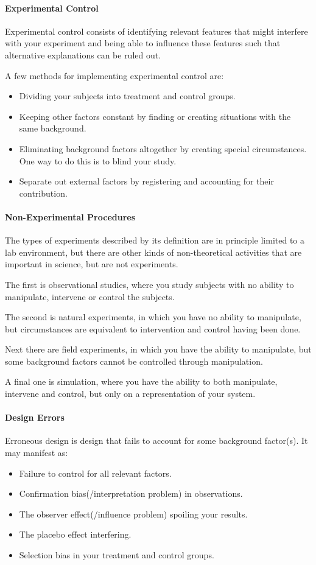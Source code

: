 \paragraph{Experimental Control}
Experimental control consists of identifying relevant features that might interfere with your experiment and being able to influence these features such that alternative explanations can be ruled out.

A few methods for implementing experimental control are:
\begin{itemize}
	\item Dividing your subjects into treatment and control groups.
	\item Keeping other factors constant by finding or creating situations with the same background.
	\item Eliminating background factors altogether by creating special circumstances. One way to do this is to blind your study.
	\item Separate out external factors by registering and accounting for their contribution.
\end{itemize}

\paragraph{Non-Experimental Procedures}
The types of experiments described by its definition are in principle limited to a lab environment, but there are other kinds of non-theoretical activities that are important in science, but are not experiments.

The first is observational studies, where you study subjects with no ability to manipulate, intervene or control the subjects.

The second is natural experiments, in which you have no ability to manipulate, but circumstances are equivalent to intervention and control having been done.

Next there are field experiments, in which you have the ability to manipulate, but some background factors cannot be controlled through manipulation.

A final one is simulation, where you have the ability to both manipulate, intervene and control, but only on a representation of your system.

\paragraph{Design Errors}
Erroneous design is design that fails to account for some background factor(s). It may manifest as:
\begin{itemize}
	\item Failure to control for all relevant factors.
	\item Confirmation bias(/interpretation problem) in observations.
	\item The observer effect(/influence problem) spoiling your results.
	\item The placebo effect interfering.
	\item Selection bias in your treatment and control groups.
\end{itemize}

